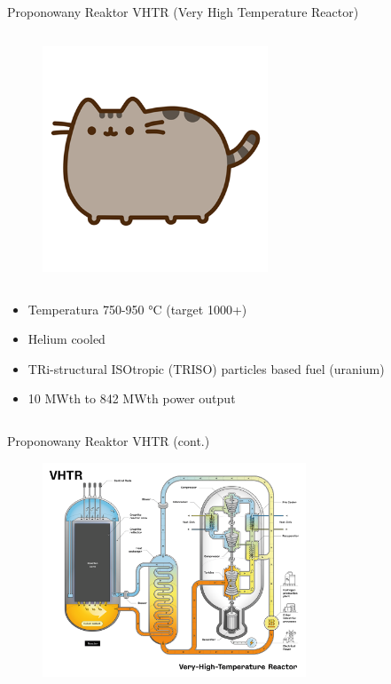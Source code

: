 \begin{columnframe}{Proponowany Reaktor VHTR (Very High Temperature Reactor)}
    \begin{column}{0.5\textwidth}
        \begin{figure}
            \centering
            \includegraphics[width=0.6\textwidth, frame]{images/pusheen.png}
        \end{figure}
    \end{column}
    \begin{column}{0.5\textwidth}
        \begin{itemize}
            \item Temperatura 750-950 \si{\degreeCelsius} (target 1000+)
            \item Helium cooled
            \item TRi-structural ISOtropic (TRISO) particles based fuel (uranium)
            \item 10 MWth to 842 MWth power output
        \end{itemize}
    \end{column}
\end{columnframe}

\begin{frame}{Proponowany Reaktor VHTR (cont.)}
    \begin{figure}
        \centering
        \includegraphics[width=0.7\textwidth, frame]{images/VHTR.png}
    \end{figure}
\end{frame}

